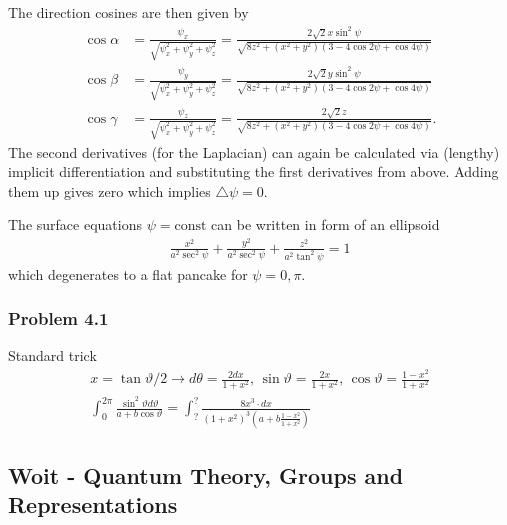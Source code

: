 \documentclass[10pt,a4paper]{article}
\theoremstyle{definition}
\begin{document}
The direction cosines are then given by
\begin{align}
    \cos\alpha&=\frac{\psi_x}{\sqrt{\psi_x^2+\psi_y^2+\psi_z^2}}=\frac{2\sqrt{2}x\sin^2\psi}{\sqrt{8z^2+(x^2+y^2)(3-4\cos2\psi+\cos4\psi)}}\\
    \cos\beta&=\frac{\psi_y}{\sqrt{\psi_x^2+\psi_y^2+\psi_z^2}}=\frac{2\sqrt{2}y\sin^2\psi}{\sqrt{8z^2+(x^2+y^2)(3-4\cos2\psi+\cos4\psi)}}\\
    \cos\gamma&=\frac{\psi_z}{\sqrt{\psi_x^2+\psi_y^2+\psi_z^2}}=\frac{2\sqrt{2}z}{\sqrt{8z^2+(x^2+y^2)(3-4\cos2\psi+\cos4\psi)}}.
\end{align}
The second derivatives (for the Laplacian) can again be calculated via (lengthy) implicit differentiation and substituting the first derivatives from above. Adding them up gives zero which implies $\triangle\psi=0$.

The surface equations $\psi=\text{const}$ can be written in form of an ellipsoid
\begin{align}
    \frac{x^2}{a^2\sec^2\psi}+\frac{y^2}{a^2\sec^2\psi}+\frac{z^2}{a^2\tan^2\psi}=1
\end{align}
which degenerates to a flat pancake for $\psi=0,\pi$.

\subsubsection{Problem 4.1}
Standard trick
\begin{align}
    x=\tan\vartheta/2\rightarrow d\theta =\frac{2dx}{1+x^2},\,\sin\vartheta=\frac{2x}{1+x^2},\,\cos\vartheta=\frac{1-x^2}{1+x^2}\\
    \int_0^{2\pi}\frac{\sin^2\vartheta d\vartheta}{a+b\cos\vartheta}=\int_?^{?}\frac{8x^3\cdot dx}{(1+x^2)^3(a+b\frac{1-x^2}{1+x^2})}
\end{align}

\subsection{{\sc Woit} - Quantum Theory, Groups and Representations}
\end{document}
